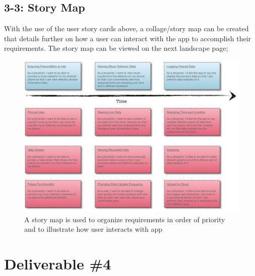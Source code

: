 \documentclass[11pt,a4paper]{article}
\begin{document}
\subsection*{3-3: Story Map}

With the use of the user story cards above, a collage/story map can be created that details further on how a user can interact with the app to accomplish their requirements. The story map can be viewed on the next landscape page;

\newpage
\begin{landscape}
\begin{figure}[h]
  \centering
  \vspace*{-2cm} \hspace*{-0.5cm}
      \includegraphics[width=1.9\textwidth]{storymap.png}
      \caption{A story map is used to organize requirements in order of priority and to illustrate how user interacts with app}
  
\end{figure}
\end{landscape}

\section*{Deliverable \#4}
\end{document}
